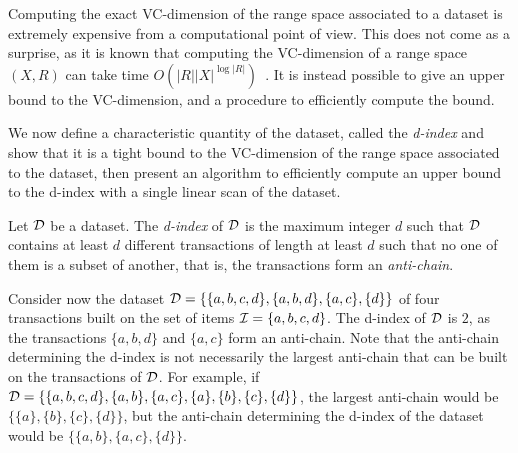 Computing the exact VC-dimension of the range space associated to a dataset is
extremely expensive from a computational point of view. This does not come as a
surprise, as it is known that computing the VC-dimension of a range space $(X,R)$
can take time $O(|R||X|^{\log|R|})$~\cite[Thm.~4.1]{LinialMR91}. It is instead
possible to give an upper bound to the VC-dimension, and a procedure to
efficiently compute the bound.

We now define a characteristic quantity of the dataset, called the
\emph{d-index} and show that it is a tight bound to the VC-dimension of the
range space associated to the dataset, then present an algorithm to efficiently
compute an upper bound to the d-index with a single linear scan of the dataset.

\begin{definition}\label{def:vcminedindex}
  Let ${\cal D}$ be a dataset. The \emph{d-index} of ${\cal D}$ is the maximum integer $d$
  such that ${\cal D}$ contains at least $d$ different transactions of length at
  least $d$ such that no one of them is a subset of another,
  that is, the transactions form an \emph{anti-chain}.
\end{definition}

Consider now the dataset ${\cal D}=\{\{a,b,c,d\},\{a,b,d\},\{a,c\},\{d\}\}$ of four
transactions built on the set of items ${\cal I}=\{a,b,c,d\}$. The d-index of ${\cal D}$ is
$2$, as the transactions $\{a,b,d\}$ and $\{a,c\}$ form an anti-chain.
Note that the anti-chain determining the d-index 
is not necessarily the largest anti-chain that can be built on the transactions of
${\cal D}$. For example, if
${\cal D}=\{\{a,b,c,d\},\{a,b\},\{a,c\},\{a\},\{b\},\{c\},\{d\}\}$, the largest
anti-chain would be $\{\{a\},\{b\},\{c\},\{d\}\}$, but the anti-chain
determining the d-index of the dataset 
would be $\{\{a,b\},\{a,c\},\{d\}\}$.

